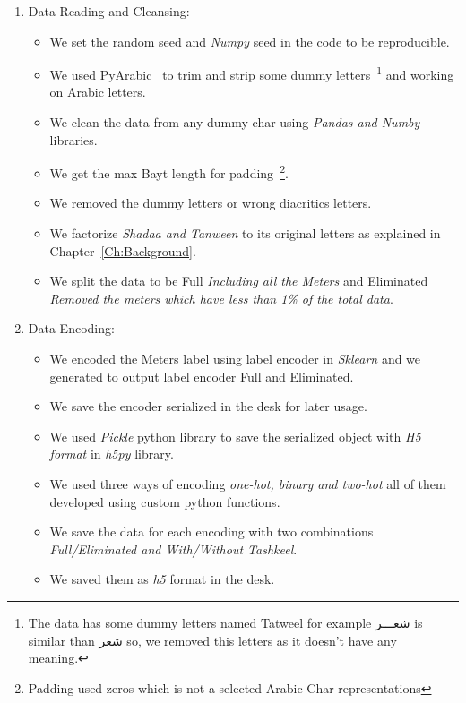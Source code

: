 \begin{enumerate}
 \item Data Reading and Cleansing:
 \begin{itemize}
  \item We set the random seed and \textit{Numpy} seed in the code to be reproducible.
  \item We used PyArabic~\cite{Pyarabic_2010} to trim and strip some dummy letters~\footnote{The data has some dummy letters named Tatweel for example \textarabic{شعـــر} is similar than \textarabic{شعر} so, we removed this letters as it doesn't have any meaning. } and working on Arabic letters.
  \item We clean the data from any dummy char using \textit{Pandas and Numby} libraries.
  \item We get the max Bayt length for padding~\footnote{Padding used zeros which is not a selected Arabic Char representations}.
  \item We removed the dummy letters or wrong diacritics letters.
  \item We factorize \textit{Shadaa and Tanween} to its original letters as explained in Chapter~\ref{Ch:Background}.
  \item We split the data to be Full\textit{ Including all the Meters} and Eliminated\textit{ Removed the meters which have less than 1\% of the total data}.
 \end{itemize}
 
 \item Data Encoding:
 \begin{itemize}
  \item We encoded the Meters label using label encoder in \textit{Sklearn} and we generated to output label encoder Full and Eliminated.
  \item We save the encoder serialized in the desk for later usage.
  \item We used \textit{Pickle} python library to save the serialized object with \textit{H5 format} in \textit{h5py} library.
  \item We used three ways of encoding \textit{\textit{one-hot}, \textit{binary} and \textit{two-hot}} all of them developed using custom python functions.
  \item We save the data for each encoding with two combinations \textit{Full/Eliminated and With/Without Tashkeel}.
  \item We saved them as \textit{h5} format in the desk.
 \end{itemize}


\end{enumerate}
